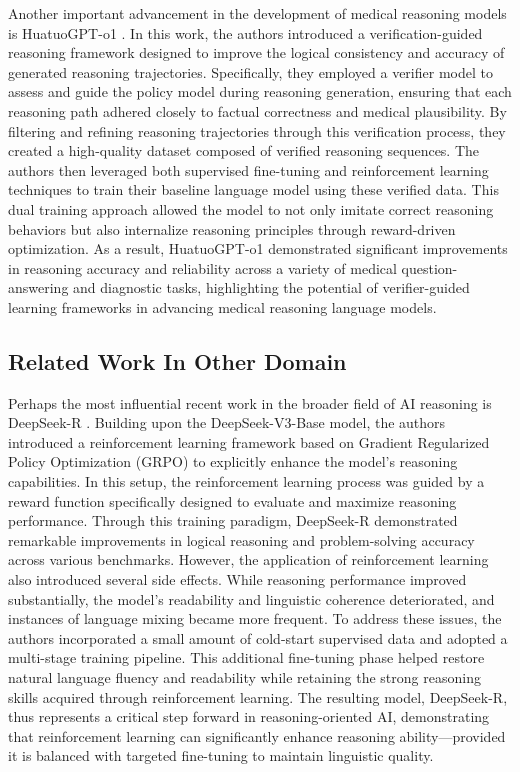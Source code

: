 \documentclass[conference]{IEEEtran}
\begin{document}
Another important advancement in the development of medical reasoning models is HuatuoGPT-o1
\cite{b15}. 
In this work, the authors introduced a verification-guided reasoning framework designed to improve the logical consistency and accuracy of generated reasoning trajectories. Specifically, they employed a verifier model to assess and guide the policy model during reasoning generation, ensuring that each reasoning path adhered closely to factual correctness and medical plausibility. By filtering and refining reasoning trajectories through this verification process, they created a high-quality dataset composed of verified reasoning sequences. The authors then leveraged both supervised fine-tuning and reinforcement learning techniques to train their baseline language model using these verified data. This dual training approach allowed the model to not only imitate correct reasoning behaviors but also internalize reasoning principles through reward-driven optimization. As a result, HuatuoGPT-o1 demonstrated significant improvements in reasoning accuracy and reliability across a variety of medical question-answering and diagnostic tasks, highlighting the potential of verifier-guided learning frameworks in advancing medical reasoning language models.


         \subsection{Related Work In Other Domain}
Perhaps the most influential recent work in the broader field of AI reasoning is DeepSeek-R
\cite{b16}. Building upon the DeepSeek-V3-Base model, the authors introduced a reinforcement learning framework based on Gradient Regularized Policy Optimization (GRPO)
\cite{b17} 
to explicitly enhance the model’s reasoning capabilities. In this setup, the reinforcement learning process was guided by a reward function specifically designed to evaluate and maximize reasoning performance. Through this training paradigm, DeepSeek-R demonstrated remarkable improvements in logical reasoning and problem-solving accuracy across various benchmarks.  
However, the application of reinforcement learning also introduced several side effects. While reasoning performance improved substantially, the model’s readability and linguistic coherence deteriorated, and instances of language mixing became more frequent. To address these issues, the authors incorporated a small amount of cold-start supervised data and adopted a multi-stage training pipeline. This additional fine-tuning phase helped restore natural language fluency and readability while retaining the strong reasoning skills acquired through reinforcement learning. The resulting model, DeepSeek-R, thus represents a critical step forward in reasoning-oriented AI, demonstrating that reinforcement learning can significantly enhance reasoning ability—provided it is balanced with targeted fine-tuning to maintain linguistic quality.
\end{document}
